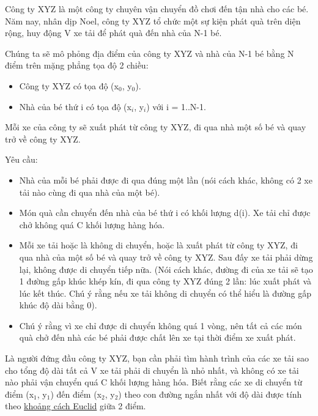 Công ty XYZ là một công ty chuyên vận chuyển đồ chơi đến tận nhà cho các bé. Năm nay, nhân dịp Noel, công ty XYZ tổ chức một sự kiện phát quà trên diện rộng, huy động V xe tải để phát quà đến nhà của N-1 bé.

Chúng ta sẽ mô phỏng địa điểm của công ty XYZ và nhà của N-1 bé bằng N điểm trên mặng phẳng tọa độ 2 chiều:
\begin{itemize}
	\item Công ty XYZ có tọa độ (x$_0$, y$_0$).
	\item Nhà của bé thứ i có tọa độ (x$_i$, y$_i$) với i = 1..N-1.
\end{itemize}

Mỗi xe của công ty sẽ xuất phát từ công ty XYZ, đi qua nhà một số bé và quay trở về công ty XYZ.

Yêu cầu:
\begin{itemize}
	\item Nhà của mỗi bé phải được đi qua đúng một lần (nói cách khác, không có 2 xe tải nào cùng đi qua nhà của một bé).
	\item Món quà cần chuyển đến nhà của bé thứ i có khối lượng d(i). Xe tải chỉ được chở không quá C khối lượng hàng hóa.
	\item Mỗi xe tải hoặc là không di chuyển, hoặc là xuất phát từ công ty XYZ, đi qua nhà của một số bé và quay trở về công ty XYZ. Sau đấy xe tải phải dừng lại, không được di chuyển tiếp nữa. (Nói cách khác, đường đi của xe tải sẽ tạo 1 đường gấp khúc khép kín, đi qua công ty XYZ đúng 2 lần: lúc xuất phát và lúc kết thúc. Chú ý rằng nếu xe tải không di chuyển có thể hiểu là đường gấp khúc độ dài bằng 0).
	\item Chú ý rằng vì xe chỉ được di chuyển không quá 1 vòng, nên tất cả các món quà chở đến nhà các bé phải được chất lên xe tại thời điểm xe xuất phát.
\end{itemize}

Là người đứng đầu công ty XYZ, bạn cần phải tìm hành trình của các xe tải sao cho tổng độ dài tất cả V xe tải phải di chuyển là nhỏ nhất, và không có xe tải nào phải vận chuyển quá C khối lượng hàng hóa. Biết rằng các xe di chuyển từ điểm (x$_1$, y$_1$) đến điểm (x$_2$, y$_2$) theo con đường ngắn nhất với độ dài được tính theo \href{http://vi.wikipedia.org/wiki/Kho%E1%BA%A3ng_c%C3%A1ch_Euclid}{khoảng cách Euclid} giữa 2 điểm.